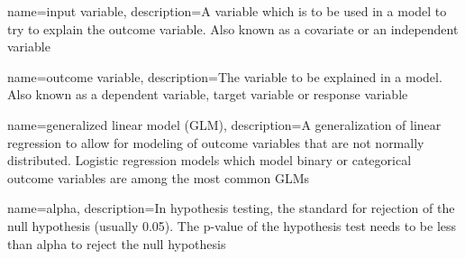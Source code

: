 {
    name={input variable},
    description={A variable which is to be used in a model to try to explain the outcome variable.  Also known as a covariate or an independent variable}
}

{
    name={outcome variable},
    description={The variable to be explained in a model.  Also known as a dependent variable, target variable or response variable}
}

{
    name={generalized linear model (GLM)},
    description={A generalization of linear regression to allow for modeling of outcome variables that are not normally distributed.  Logistic regression models which model binary or categorical outcome variables are among the most common GLMs}
}

{
    name={alpha},
    description={In hypothesis testing, the standard for rejection of the null hypothesis (usually 0.05).  The p-value of the hypothesis test needs to be less than alpha to reject the null hypothesis}
}

\glsaddall

\frontmatter
